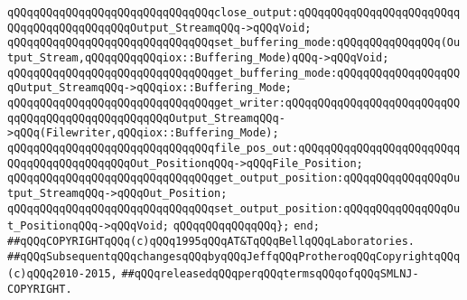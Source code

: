 \verb|qQQqqQQqqQQqqQQqqQQqqQQqqQQqqQQqclose_output:qQQqqQQqqQQqqQQqqQQqqQQqqQQqqQQqqQQqqQQqqQQqOutput_StreamqQQq->qQQqVoid;|\newline
\newline
\verb|qQQqqQQqqQQqqQQqqQQqqQQqqQQqqQQqset_buffering_mode:qQQqqQQqqQQqqQQq(Output_Stream,qQQqqQQqqQQqiox::Buffering_Mode)qQQq->qQQqVoid;|\newline
\verb|qQQqqQQqqQQqqQQqqQQqqQQqqQQqqQQqget_buffering_mode:qQQqqQQqqQQqqQQqqQQqOutput_StreamqQQq->qQQqiox::Buffering_Mode;|\newline
\newline
\verb|qQQqqQQqqQQqqQQqqQQqqQQqqQQqqQQqget_writer:qQQqqQQqqQQqqQQqqQQqqQQqqQQqqQQqqQQqqQQqqQQqqQQqqQQqOutput_StreamqQQq->qQQq(Filewriter,qQQqiox::Buffering_Mode);|\newline
\newline
\verb|qQQqqQQqqQQqqQQqqQQqqQQqqQQqqQQqfile_pos_out:qQQqqQQqqQQqqQQqqQQqqQQqqQQqqQQqqQQqqQQqqQQqOut_PositionqQQq->qQQqFile_Position;|\newline
\newline
\verb|qQQqqQQqqQQqqQQqqQQqqQQqqQQqqQQqget_output_position:qQQqqQQqqQQqqQQqOutput_StreamqQQq->qQQqOut_Position;|\newline
\verb|qQQqqQQqqQQqqQQqqQQqqQQqqQQqqQQqset_output_position:qQQqqQQqqQQqqQQqOut_PositionqQQq->qQQqVoid;|\newline
\verb|qQQqqQQqqQQqqQQq};|\newline
\verb|end;|\newline
\newline
\newline
\verb|##qQQqCOPYRIGHTqQQq(c)qQQq1995qQQqAT&TqQQqBellqQQqLaboratories.|\newline
\verb|##qQQqSubsequentqQQqchangesqQQqbyqQQqJeffqQQqProtheroqQQqCopyrightqQQq(c)qQQq2010-2015,|\newline
\verb|##qQQqreleasedqQQqperqQQqtermsqQQqofqQQqSMLNJ-COPYRIGHT.|\newline

